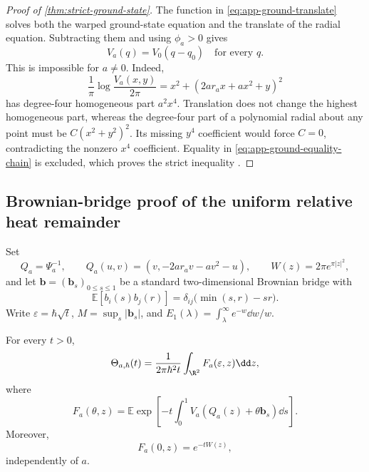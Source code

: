 \begin{proof}[Proof of \cref{thm:strict-ground-state}]
The function in \cref{eq:app-ground-translate} solves both the warped
ground-state equation and the translate of the radial equation.  Subtracting
them and using \(\phi_a>0\) gives
\begin{equation}
 V_a(q)=V_0(q-q_0)\quad\text{for every }q.
 \label{eq:app-potential-radial-contradiction}
\end{equation}
This is impossible for \(a\ne0\).  Indeed,
\begin{equation}
 \frac1\pi\log\frac{V_a(x,y)}{2\pi}
 =x^2+(2ar_ax+ax^2+y)^2
 \label{eq:app-quartic-nonradiality}
\end{equation}
has degree-four homogeneous part \(a^2x^4\).  Translation does not change
the highest homogeneous part, whereas the degree-four part of a polynomial
radial about any point must be \(C(x^2+y^2)^2\).  Its missing \(y^4\)
coefficient would force \(C=0\), contradicting the nonzero \(x^4\)
coefficient.  Equality in \cref{eq:app-ground-equality-chain} is excluded,
which proves the strict inequality \citep{BrothersZiemer1988}.
\end{proof}

\subsection{Brownian-bridge proof of the uniform relative heat remainder}
\label{app:relative-heat-proof}

Set
\begin{equation}
 Q_a=\Psi_a^{-1},\qquad
 Q_a(u,v)=(v,-2ar_av-av^2-u),
 \qquad W(z)=2\pi e^{\pi|z|^2},
 \label{eq:app-heat-QW}
\end{equation}
and let \(\mathbf b=(\mathbf b_s)_{0\le s\le1}\) be a standard
two-dimensional Brownian bridge with
\begin{equation}
 \mathbb E[b_i(s)b_j(r)]
 =\delta_{ij}\bigl(\min(s,r)-sr\bigr).
 \label{eq:app-bridge-covariance}
\end{equation}
Write \(\varepsilon=\hbar\sqrt t\),
\(M=\sup_s|\mathbf b_s|\), and
\(E_1(\lambda)=\int_\lambda^\infty e^{-w}\dd w/w\).

\begin{lemma}
\label{lem:app-common-heat-coordinate}
For every \(t>0\),
\begin{equation}
 \Theta_{a,\hbar}(t)
 =\frac1{2\pi\hbar^2t}\int_{\R^2}
 F_a(\varepsilon,z)\dd z,
 \label{eq:app-common-heat-coordinate}
\end{equation}
where
\begin{equation}
 F_a(\theta,z)=\mathbb E\exp\!\left[-t\int_0^1
 V_a(Q_a(z)+\theta\mathbf b_s)\dd s\right].
 \label{eq:app-Fa-definition}
\end{equation}
Moreover,
\begin{equation}
 F_a(0,z)=e^{-tW(z)},
 \label{eq:app-pointwise-classical-cancellation}
\end{equation}
independently of \(a\).
\end{lemma}

